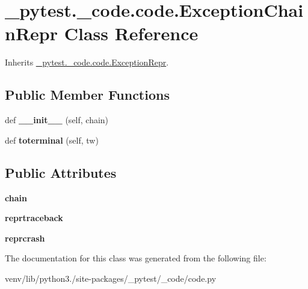 \hypertarget{class__pytest_1_1__code_1_1code_1_1_exception_chain_repr}{}\section{\+\_\+pytest.\+\_\+code.\+code.\+Exception\+Chain\+Repr Class Reference}
\label{class__pytest_1_1__code_1_1code_1_1_exception_chain_repr}


Inherits \hyperlink{class__pytest_1_1__code_1_1code_1_1_exception_repr}{\+\_\+pytest.\+\_\+code.\+code.\+Exception\+Repr}.

\subsection*{Public Member Functions}
\begin{DoxyCompactItemize}
\item 
\mbox{\label{class__pytest_1_1__code_1_1code_1_1_exception_chain_repr_af9b6f6ed793bf86a5668e53ad376eb9d}} 
def {\bfseries \+\_\+\+\_\+init\+\_\+\+\_\+} (self, chain)
\item 
\mbox{\label{class__pytest_1_1__code_1_1code_1_1_exception_chain_repr_a144a545f4d0c554b276cb9c3e97866a2}} 
def {\bfseries toterminal} (self, tw)
\end{DoxyCompactItemize}
\subsection*{Public Attributes}
\begin{DoxyCompactItemize}
\item 
\mbox{\label{class__pytest_1_1__code_1_1code_1_1_exception_chain_repr_a6169f1566e70a407e280f092cf0abcd5}} 
{\bfseries chain}
\item 
\mbox{\label{class__pytest_1_1__code_1_1code_1_1_exception_chain_repr_a8951ca3a18f70ed64653479478b4e366}} 
{\bfseries reprtraceback}
\item 
\mbox{\label{class__pytest_1_1__code_1_1code_1_1_exception_chain_repr_a8705a53795d92b9c995a0ddba96fd1d6}} 
{\bfseries reprcrash}
\end{DoxyCompactItemize}


The documentation for this class was generated from the following file\+:\begin{DoxyCompactItemize}
\item 
venv/lib/python3./site-\/packages/\+\_\+pytest/\+\_\+code/code.\+py\end{DoxyCompactItemize}
